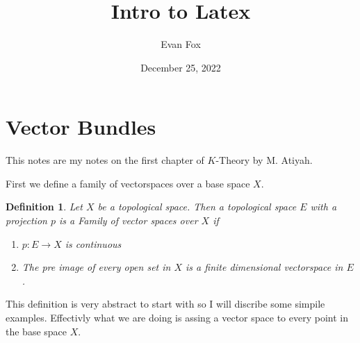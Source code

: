 \documentclass{article}
\author{Evan Fox}
\title{Intro to Latex}
\date{December 25, 2022}
\newtheorem{defn}{Definition}
\begin{document}
 
\maketitle 

\tableofcontents 

\section{Vector Bundles} 
This notes are my notes on the first chapter of $K$-Theory by M. Atiyah. 


First we define a family of vectorspaces over a base space $X$. 
\begin{defn}
    Let $X$ be a topological space. Then a topological space $E$ with a projection $p$ is a \emph{Family of vector spaces over $X$} if 
    \begin{enumerate} 
        \item $p:E \to X$ is continuous 
        \item The pre image of every open set in $X$ is a finite dimensional vectorspace in $E$. 
    \end{enumerate}
\end{defn}

This definition is very abstract to start with so I will discribe some simpile examples. Effectivly what we are doing is assing a vector space to every point in the base space $X$. 
\end{document}
